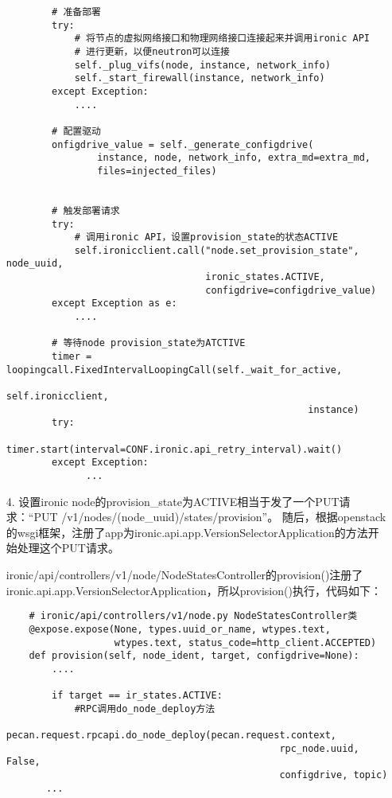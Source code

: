 \documentclass[a4paper,left=1.5cm,right=1.5cm,11pt]{article}
\begin{document}
\begin{itemize}
\begin{lstlisting}
        # 准备部署
        try:
            # 将节点的虚拟网络接口和物理网络接口连接起来并调用ironic API
            # 进行更新，以便neutron可以连接
            self._plug_vifs(node, instance, network_info)
            self._start_firewall(instance, network_info)
        except Exception:
            ....

        # 配置驱动
        onfigdrive_value = self._generate_configdrive(
                instance, node, network_info, extra_md=extra_md,
                files=injected_files)


        # 触发部署请求
        try:
            # 调用ironic API，设置provision_state的状态ACTIVE
            self.ironicclient.call("node.set_provision_state", node_uuid,
                                   ironic_states.ACTIVE,
                                   configdrive=configdrive_value)
        except Exception as e:
            ....

        # 等待node provision_state为ATCTIVE
        timer = loopingcall.FixedIntervalLoopingCall(self._wait_for_active,
                                                     self.ironicclient,
                                                     instance)
        try:
            timer.start(interval=CONF.ironic.api_retry_interval).wait()
        except Exception:
              ...
		\end{lstlisting}

		\item[4.] 设置ironic node的provision\_state为ACTIVE相当于发了一个PUT请求：“PUT /v1/nodes/(node\_uuid)/states/provision”。
		随后，根据openstack的wsgi框架，注册了app为ironic.api.app.VersionSelectorApplication的方法开始处理这个PUT请求。\par

		ironic/api/controllers/v1/node/NodeStatesController的provision()注册了ironic.api.app.VersionSelectorApplication，所以provision()执行，代码如下：
		\begin{lstlisting}
	# ironic/api/controllers/v1/node.py NodeStatesController类
	@expose.expose(None, types.uuid_or_name, wtypes.text,
                   wtypes.text, status_code=http_client.ACCEPTED)
    def provision(self, node_ident, target, configdrive=None):
        ....

        if target == ir_states.ACTIVE:
            #RPC调用do_node_deploy方法
            pecan.request.rpcapi.do_node_deploy(pecan.request.context,
                                                rpc_node.uuid, False,
                                                configdrive, topic)
       ...
		\end{lstlisting}


\end{itemize}
\end{document}
